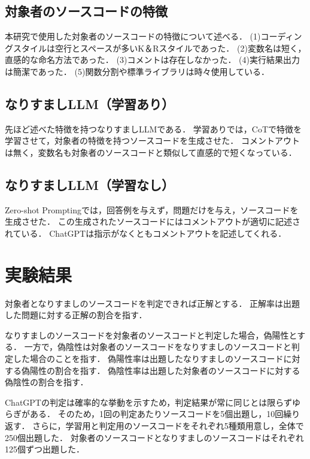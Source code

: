 \documentclass[twocolumn]{jarticle}
\begin{document}
\subsection{対象者のソースコードの特徴}

本研究で使用した対象者のソースコードの特徴について述べる．
(1)コーディングスタイルは空行とスペースが多いK＆Rスタイルであった．
(2)変数名は短く，直感的な命名方法であった．
(3)コメントは存在しなかった．
(4)実行結果出力は簡潔であった．
(5)関数分割や標準ライブラリは時々使用している．

\subsection{なりすましLLM（学習あり）}

先ほど述べた特徴を持つなりすましLLMである．
学習ありでは，CoTで特徴を学習させて，対象者の特徴を持つソースコードを生成させた．
コメントアウトは無く，変数名も対象者のソースコードと類似して直感的で短くなっている．

\subsection{なりすましLLM（学習なし）}

Zero-shot Promptingでは，回答例を与えず，問題だけを与え，ソースコードを生成させた．
この生成されたソースコードにはコメントアウトが適切に記述されている．
ChatGPTは指示がなくともコメントアウトを記述してくれる．

\section{実験結果}

対象者となりすましのソースコードを判定できれば正解とする．
正解率は出題した問題に対する正解の割合を指す．

なりすましのソースコードを対象者のソースコードと判定した場合，偽陽性とする．
一方で，偽陰性は対象者のソースコードをなりすましのソースコードと判定した場合のことを指す．
偽陽性率は出題したなりすましのソースコードに対する偽陽性の割合を指す．
偽陰性率は出題した対象者のソースコードに対する偽陰性の割合を指す．

ChatGPTの判定は確率的な挙動を示すため，判定結果が常に同じとは限らずゆらぎがある．
そのため，1回の判定あたりソースコードを5個出題し，10回繰り返す．
さらに，学習用と判定用のソースコードをそれぞれ5種類用意し，全体で250個出題した．
対象者のソースコードとなりすましのソースコードはそれぞれ125個ずつ出題した．
\end{document}
